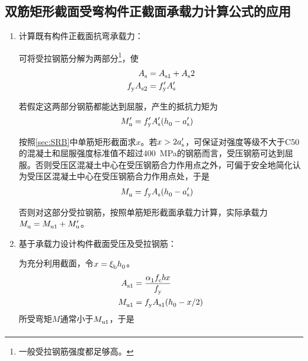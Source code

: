 \documentclass{article}
\begin{document}
\subsection{双筋矩形截面受弯构件正截面承载力计算公式的应用}
\begin{enumerate}
      \item 计算既有构件正截面抗弯承载力：
            \par 可将受拉钢筋分解为两部分\footnote{一般受拉钢筋强度都足够高。}，使
            \begin{align*}
                  \script{A}{s}               & = \script{A}{s1}+\script{A}{s}2              \\
                  \script{f}{y}\script{A}{s2} & = \script{f}[\prime]{y}\script{A}[\prime]{s}
            \end{align*}
            \par 若假定这两部分钢筋都能达到屈服，产生的抵抗力矩为
            \begin{align*}
                  \script{M}[\prime]{u} & = \script{f}[\prime]{y}\script{A}[\prime]{s} (\script{h}{0}-\script{a}[\prime]{s})
            \end{align*}
            \par 按照\cref{sec:SRB}中单筋矩形截面求$x$。若$x>2\script{a}[\prime]{s}$，可保证对强度等级不大于C50的混凝土和屈服强度标准值不超过\SI{400}{\MPa}的钢筋而言，受压钢筋可达到屈服。否则受压区混凝土中心在受压钢筋合力作用点之外，可偏于安全地简化认为受压区混凝土中心在受压钢筋合力作用点处，于是
            \begin{align*}
                  \script{M}{u} & = \script{f}{y}\script{A}{s}(\script{h}{0}-\script{a}[\prime]{s})
            \end{align*}
            \par 否则对这部分受拉钢筋，按照单筋矩形截面承载力计算，实际承载力$\script{M}{u}=\script{M}{u1}+\script{M}[\prime]{u}$。
      \item 基于承载力设计构件截面受压及受拉钢筋：
            \par 为充分利用截面，令$x=\script{\xi}{b}\script{h}{0}$。
            \begin{align*}
                  \script{A}{s1} & = \frac{\script{\alpha}{1}\script{f}{c}bx}{\script{f}{y}} \\
                  \script{M}{u1} & = \script{f}{y}\script{A}{s1}(\script{h}{0}-x/2)
            \end{align*}
            所受弯矩$M$通常小于$\script{M}{u1}$，于是
            \begin{align*}

\end{align*}
\end{enumerate}
\end{document}
